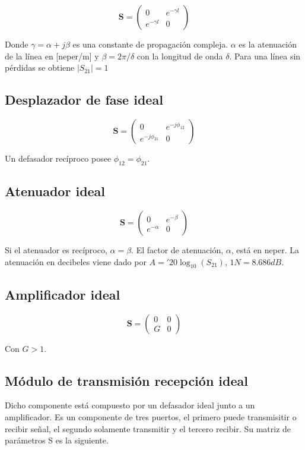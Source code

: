 $$
\mathbf{S} = \begin{pmatrix} 0 & e^{-\gamma l}\\e^{-\gamma l} & 0\end{pmatrix}
$$

Donde $\gamma = \alpha + j\beta$ es una constante de propagación compleja. $\alpha$ es la atenuación de la línea en [neper/m]
y $\beta = 2\pi/\delta$ con la longitud de onda $\delta$. Para una línea sin pérdidas se obtiene $|S_{21}| = 1$

\subsection{Desplazador de fase ideal}

$$
\mathbf{S} = \begin{pmatrix} 0 & e^{-j\phi_{12}}\\e^{-j\phi_{21}} & 0\end{pmatrix}
$$

Un defasador recíproco posee $\phi_{12} = \phi_{21}$.

\subsection{Atenuador ideal}

$$
\mathbf{S} = \begin{pmatrix} 0 & e^{-\beta}\\e^{-\alpha} & 0\end{pmatrix}
$$

Si el atenuador es recíproco, $\alpha = \beta$. El factor de atenuación, $\alpha$, está en neper. La atenuación en decibeles
viene dado por $A = '20\log_{10}(S_{21})$, $1N = 8.686dB$.


\subsection{Amplificador ideal}

$$
\mathbf{S} = \begin{pmatrix} 0 & 0\\G & 0\end{pmatrix}
$$

Con $G > 1$.


\subsection{Módulo de transmisión recepción ideal}

Dicho componente está compuesto por un defasador ideal junto a un amplificador. Es un componente de tres puertos, el primero 
puede transmisitir o recibir señal, el segundo solamente transmitir y el tercero recibir. Su matriz de parámetros S es la siguiente.

